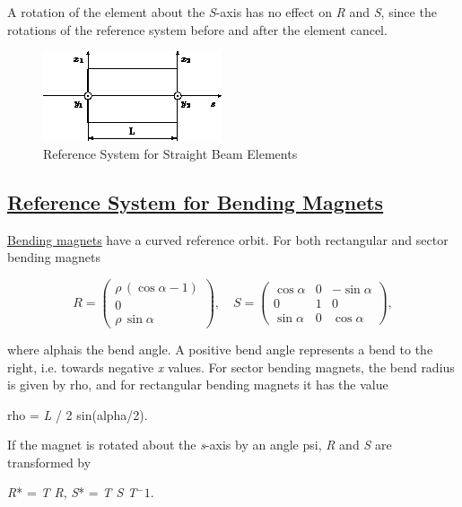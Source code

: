  A rotation of the element about the \textit{S}-axis has no effect on \textit{R} and \textit{S}, since the rotations of the reference system  before and after the element cancel. 

\begin{figure}[H]
  \centering
	\includegraphics{figures/ref_straight.png}
  \caption{Reference System for Straight Beam Elements}
\end{figure}


\subsection{\href{rbend}{Reference System for Bending Magnets}}\href{bend.html}{Bending magnets} have a curved reference orbit. For both rectangular and sector bending magnets 


\[
R =
 \begin{pmatrix}
  \rho\,(\cos \alpha - 1) \\
  0 \\
  \rho\,\sin \alpha
 \end{pmatrix}
, \quad
S =
 \begin{pmatrix}
  \cos \alpha & 0 &  -\sin \alpha \\
  0 & 1 &  0 \\
  \sin \alpha & 0 &  \cos \alpha
 \end{pmatrix}
,
\]

 where alphais the bend angle. A positive bend angle represents a bend to the right, i.e. towards negative \textit{x} values. For sector bending magnets, the bend radius is given by rho, and for rectangular bending magnets it has the value 

 rho = \textit{L} / 2 sin(alpha/2). 

 If the magnet is rotated about the \textit{s}-axis by an angle psi, \textit{R} and \textit{S} are transformed by 

\textit{R}* = \textit{T R}, \textit{S}* = \textit{T S T$^-1$}. 

